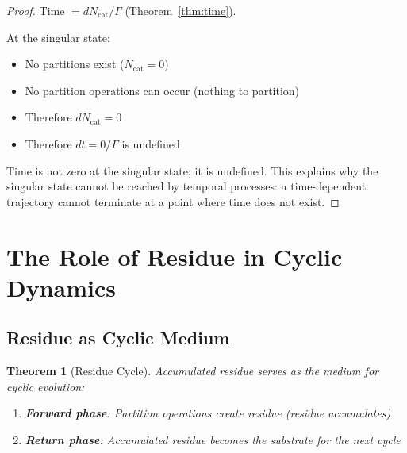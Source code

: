 \documentclass[twocolumn,10pt,a4paper]{article}
\newtheorem{theorem}{Theorem}[section]
\theoremstyle{definition}
\theoremstyle{remark}
\begin{document}
\begin{proof}
Time $= dN_{\text{cat}}/\Gamma$ (Theorem~\ref{thm:time}).

At the singular state:
\begin{itemize}
    \item No partitions exist ($N_{\text{cat}} = 0$)
    \item No partition operations can occur (nothing to partition)
    \item Therefore $dN_{\text{cat}} = 0$
    \item Therefore $dt = 0/\Gamma$ is undefined
\end{itemize}

Time is not zero at the singular state; it is undefined. This explains why the singular state cannot be reached by temporal processes: a time-dependent trajectory cannot terminate at a point where time does not exist.
\end{proof}

\section{The Role of Residue in Cyclic Dynamics}
\label{sec:residue_cycle}

\subsection{Residue as Cyclic Medium}

\begin{theorem}[Residue Cycle]
\label{thm:residue_cycle}
Accumulated residue serves as the medium for cyclic evolution:
\begin{enumerate}
    \item \textbf{Forward phase}: Partition operations create residue (residue accumulates)
    \item \textbf{Return phase}: Accumulated residue becomes the substrate for the next cycle
\end{enumerate}
\end{theorem}
\end{document}
